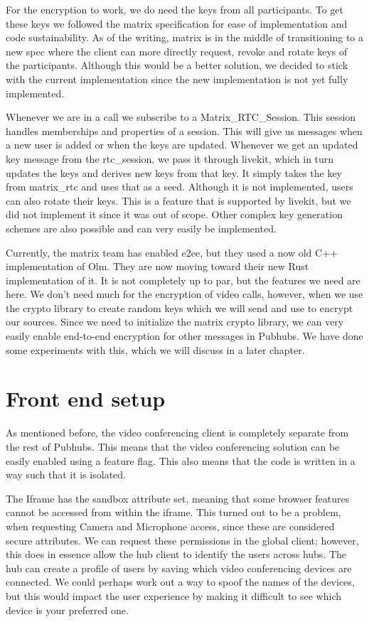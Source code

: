 \documentclass{report}
\begin{document}

For the encryption to work, we do need the keys from all participants. To get these keys we followed the matrix
specification for ease of implementation and code sustainability. As of the writing, matrix is in the middle of
transitioning to a new spec where the client can more directly request, revoke and rotate keys of the participants.
Although this would be a better solution, we decided to stick with the current implementation since the new
implementation is not yet fully implemented.

Whenever we are in a call we subscribe to a Matrix\_RTC\_Session. This session handles memberships and
properties of a session. This will give us messages when a new user is added or when the keys are updated.
Whenever we get an updated key message from the rtc\_session, we pass it through livekit, which in turn updates
the keys and derives new keys from that key. It simply takes the key from matrix\_rtc and uses
that as a seed. Although it is not implemented, users can also rotate their keys. This is a feature that is
supported by livekit, but we did not implement it since it was out of scope. Other complex key generation schemes
are also possible and can very easily be implemented.

Currently, the matrix team has enabled e2ee, but they used a now old C++ implementation of Olm. They are now moving
toward their new Rust implementation of it. It is not completely up to par, but the features we need are here. We
don't need much for the encryption of video calls, however, when we use the crypto library to create random keys
which we will send and use to encrypt our sources. Since we need to initialize the matrix crypto library, we can
very easily enable end-to-end encryption for other messages in Pubhubs. We have done some experiments with this,
which we will discuss in a later chapter.


\section{Front end setup}
As mentioned before, the video conferencing client is completely separate from the rest of Pubhubs. This means that
the video conferencing solution can be easily enabled using a feature flag. This also means that the code is
written in a way such that it is isolated.

The Iframe has the sandbox attribute set, meaning that some browser features cannot be accessed from within the
iframe. This turned out to be a problem, when requesting Camera and Microphone access, since these are considered
secure attributes. We can request these permissions in the global client; however, this does in essence allow the
hub client to identify the users across hubs. The hub can create a profile of users by saving which video
conferencing devices are connected. We could perhaps work out a way to spoof the names of the devices, but this
would impact the user experience by making it difficult to see which device is your preferred one.
\end{document}
